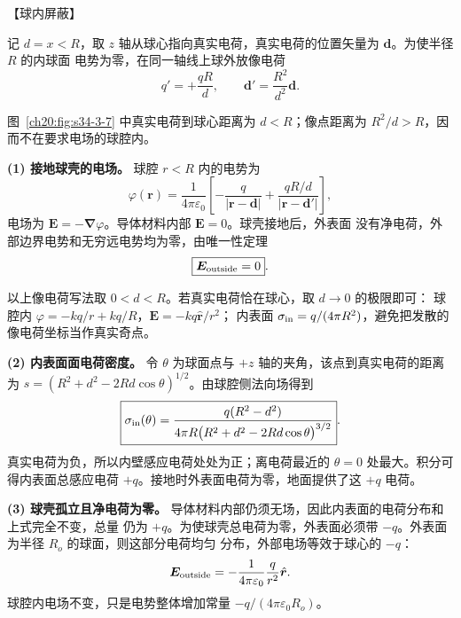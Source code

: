 {\begin{origexamplebox}{【球内屏蔽】}
\begin{center}
\begin{tikzpicture}[>=Latex,scale=.8]
\end{tikzpicture}\end{center}
\label{ch20:fig:em-source-thirty-fourth-section-5}
\end{origexamplebox}\par\nopagebreak[4]

\begin{xesolution}
记 $d=x<R$，取 $z$ 轴从球心指向真实电荷，真实电荷的位置矢量为 $\boldsymbol d$。为使半径 $R$ 的内球面
电势为零，在同一轴线上球外放像电荷
\[
  q'=+\frac{qR}{d},\qquad
  \boldsymbol d'=\frac{R^2}{d^2}\boldsymbol d.
\]

图~\ref{ch20:fig:s34-3-7} 中真实电荷到球心距离为 $d<R$；像点距离为 $R^2/d>R$，因而不在要求电场的球腔内。

\par\noindent\begin{minipage}{\linewidth}
\cavityImageFigure
{}\label{ch20:fig:s34-3-7}
\end{minipage}\par\medskip

\textbf{(1) 接地球壳的电场。} 球腔 $r<R$ 内的电势为
\[
  \boxed{\varphi(\boldsymbol r)=\frac1{4\pi\varepsilon_0}
  \left[-\frac q{|\boldsymbol r-\boldsymbol d|}
  +\frac{qR/d}{|\boldsymbol r-\boldsymbol d'|}\right]},
\]
电场为 $\boldsymbol E=-\boldsymbol\nabla\varphi$。导体材料内部 $\boldsymbol E=0$。球壳接地后，外表面
没有净电荷，外部边界电势和无穷远电势均为零，由唯一性定理
\[
  \boxed{\boldsymbol E_{\rm outside}=0}.
\]

以上像电荷写法取 $0<d<R$。若真实电荷恰在球心，取 $d\to0$ 的极限即可：
球腔内 $\varphi=-kq/r+kq/R$，$\boldsymbol E=-kq\hat{\boldsymbol r}/r^2$；
内表面 $\sigma_{\rm in}=q/(4\pi R^2)$，避免把发散的像电荷坐标当作真实奇点。

\textbf{(2) 内表面面电荷密度。} 令 $\theta$ 为球面点与 $+z$ 轴的夹角，该点到真实电荷的距离为
$s=(R^2+d^2-2Rd\cos\theta)^{1/2}$。由球腔侧法向场得到
\[
  \boxed{\sigma_{\rm in}(\theta)=
  \frac{q(R^2-d^2)}{4\pi R\bigl(R^2+d^2-2Rd\cos\theta\bigr)^{3/2}}}.
\]
真实电荷为负，所以内壁感应电荷处处为正；离电荷最近的 $\theta=0$ 处最大。积分可得内表面总感应电荷
$+q$。接地时外表面电荷为零，地面提供了这 $+q$ 电荷。

\textbf{(3) 球壳孤立且净电荷为零。} 导体材料内部仍须无场，因此内表面的电荷分布和上式完全不变，总量
仍为 $+q$。为使球壳总电荷为零，外表面必须带 $-q$。外表面为半径 $R_o$ 的球面，则这部分电荷均匀
分布，外部电场等效于球心的 $-q$：
\[
  \boldsymbol E_{\rm outside}=-\frac1{4\pi\varepsilon_0}
  \frac q{r^2}\hat{\boldsymbol r}.
\]
球腔内电场不变，只是电势整体增加常量 $-q/(4\pi\varepsilon_0R_o)$。


\end{xesolution}}
